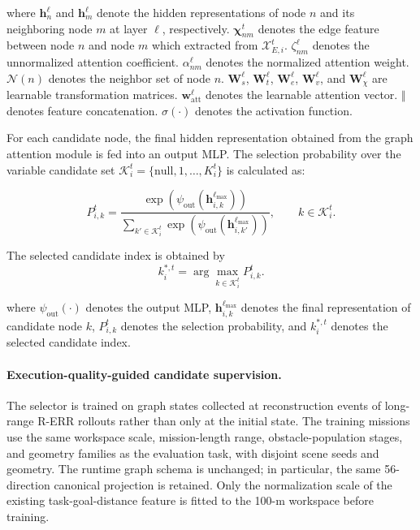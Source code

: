 \noindent
where $\mathbf h_n^{\ell}$ and $\mathbf h_m^{\ell}$ denote the hidden representations of node $n$ and its neighboring node $m$ at layer $\ell$, respectively. 
$\boldsymbol\chi_{nm}^{t}$ denotes the edge feature between node $n$ and node $m$ which extracted from $\mathcal X_{E,i}^t$. $\zeta_{nm}^{\ell}$ denotes the unnormalized attention coefficient.
$\alpha_{nm}^{\ell}$ denotes the normalized attention weight. $\mathcal N(n)$ denotes the neighbor set of node $n$. $\mathbf W_s^{\ell}$, $\mathbf W_t^{\ell}$, $\mathbf W_e^{\ell}$, $\mathbf W_v^{\ell}$, and $\mathbf W_{\chi}^{\ell}$ are learnable transformation matrices. $\mathbf w_{\mathrm{att}}^{\ell}$ denotes the learnable attention vector. $\Vert$ denotes feature concatenation. $\sigma(\cdot)$ denotes the activation function. 

For each candidate node, the final hidden representation obtained from the graph attention module is fed into an output MLP. The selection probability over the variable candidate set $\mathcal K_i^t=\{\mathrm{null},1,\ldots,K_i^t\}$ is calculated as:

\begin{equation}
\label{eq:candidate_selection}
P_{i,k}^{t}
=
\frac{
\exp(\psi_{\mathrm{out}}(\mathbf h_{i,k}^{\ell_{\max}}))
}
{
\sum_{k'\in\mathcal K_i^t}
\exp(\psi_{\mathrm{out}}(\mathbf h_{i,k'}^{\ell_{\max}}))
},
\qquad
k\in\mathcal K_i^t .
\end{equation}

The selected candidate index is obtained by
\begin{equation}
\label{eq:selected_candidate}
k_i^{*,t}
=
\arg\max_{k\in\mathcal K_i^t}
P_{i,k}^{t}.
\end{equation}

\noindent
where $\psi_{\mathrm{out}}(\cdot)$ denotes the output MLP, $\mathbf h_{i,k}^{\ell_{\max}}$ denotes the final representation of candidate node $k$, $P_{i,k}^{t}$ denotes the selection probability, and $k_i^{*,t}$ denotes the selected candidate index.

\paragraph{Execution-quality-guided candidate supervision.}

The selector is trained on graph states collected at reconstruction events of long-range R-ERR rollouts rather than only at the initial state. The training missions use the same workspace scale, mission-length range, obstacle-population stages, and geometry families as the evaluation task, with disjoint scene seeds and geometry. The runtime graph schema is unchanged; in particular, the same 56-direction canonical projection is retained. Only the normalization scale of the existing task-goal-distance feature is fitted to the 100-m workspace before training.

